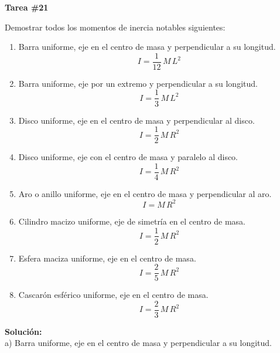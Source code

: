 \documentclass[letter,11pt]{article}
\begin{document}
\begin{center}
    {\Large \bf{Tarea \#21}}
\end{center}

Demostrar todos los momentos de inercia notables siguientes:

\begin{enumerate}[label=(\alph*)]
\item Barra uniforme, eje en el centro de masa y perpendicular a su longitud.
\begin{equation*}
    I = \frac{1}{12}\, M\, L^2
\end{equation*}
\item Barra uniforme, eje por un extremo y perpendicular a su longitud.
\begin{equation*}
    I = \frac{1}{3}\, M\, L^2
\end{equation*}
\item Disco uniforme, eje en el centro de masa y perpendicular al disco.
\begin{equation*}
    I = \frac{1}{2}\, M\, R^2
\end{equation*}
\item Disco uniforme, eje con el centro de masa y paralelo al disco.
\begin{equation*}
    I = \frac{1}{4}\, M\, R^2
\end{equation*}
\item Aro o anillo uniforme, eje en el centro de masa y perpendicular al aro.
\begin{equation*}
    I = M\, R^2
\end{equation*}
\item Cilindro macizo uniforme, eje de simetría en el centro de masa.
\begin{equation*}
    I = \frac{1}{2}\, M\, R^2
\end{equation*}
\item Esfera maciza uniforme, eje en el centro de masa.
\begin{equation*}
    I = \frac{2}{5}\, M\, R^2
\end{equation*}
\item Cascarón esférico uniforme, eje en el centro de masa.
\begin{equation*}
    I = \frac{2}{3}\, M\, R^2
\end{equation*}
\end{enumerate}

\newpage
\textbf{Solución:} \\

a) Barra uniforme, eje en el centro de masa y perpendicular a su longitud.
\end{document}
